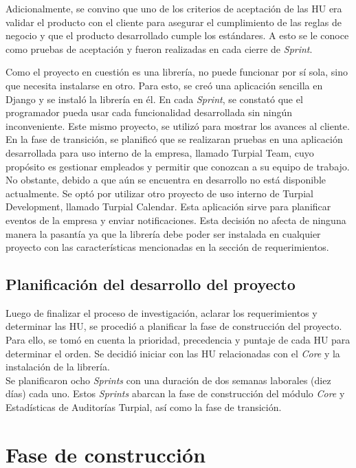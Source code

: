 Adicionalmente, se convino que uno de los criterios de aceptación de las HU era validar el producto con el cliente para asegurar el cumplimiento de las reglas de negocio y que el producto desarrollado cumple los estándares. A esto se le conoce como pruebas de aceptación y fueron realizadas en cada cierre de \textit{Sprint}.

Como el proyecto en cuestión es una librería, no puede funcionar por sí sola, sino que necesita instalarse en otro. Para esto, se creó una aplicación sencilla en Django y se instaló la librería en él. En cada \textit{Sprint}, se constató que el programador pueda usar cada funcionalidad desarrollada  sin ningún inconveniente. Este mismo proyecto, se utilizó para mostrar los avances al cliente.\\

En la fase de transición, se planificó que se realizaran pruebas en una aplicación desarrollada para uso interno de la empresa, llamado Turpial Team, cuyo propósito es gestionar empleados y permitir que conozcan a su equipo de trabajo. No obstante, debido a que aún se encuentra en desarrollo no está disponible actualmente. Se optó por utilizar otro proyecto de uso interno de Turpial Development, llamado Turpial Calendar. Esta aplicación sirve para planificar eventos de la empresa y enviar notificaciones. Esta decisión no afecta de ninguna manera la pasantía ya que la librería debe poder ser instalada en cualquier proyecto con las características mencionadas en la sección de requerimientos.

\subsection{Planificación del desarrollo del proyecto}

Luego de finalizar el proceso de investigación, aclarar los requerimientos y determinar las HU, se procedió a planificar la fase de construcción del proyecto. Para ello, se tomó en cuenta la prioridad, precedencia y puntaje de cada HU para determinar el orden. Se decidió iniciar con las HU relacionadas con el \textit{Core} y la instalación de la librería.\\

Se planificaron ocho \textit{Sprints} con una duración de dos semanas laborales (diez días) cada uno. Estos \textit{Sprints} abarcan la fase de construcción del módulo \textit{Core} y Estadísticas de Auditorías Turpial, así como la fase de transición.

\section{Fase de construcción}

